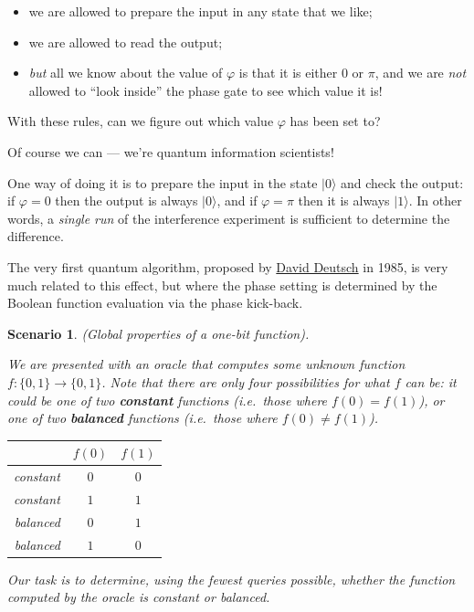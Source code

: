 \documentclass[fleqn,a4paper]{article}
\providecommand{\tightlist}{\setlength{\itemsep}{0pt}\setlength{\parskip}{0pt}}
\newtheorem*{scenario}{Scenario}
\theoremstyle{definition}
\theoremstyle{definition}
\theoremstyle{definition}
\theoremstyle{definition}
\theoremstyle{remark}
\begin{document}
\begin{itemize}
\tightlist
\item
  we are allowed to prepare the input in any state that we like;
\item
  we are allowed to read the output;
\item
  \emph{but} all we know about the value of \(\varphi\) is that it is either \(0\) or \(\pi\), and we are \emph{not} allowed to ``look inside'' the phase gate to see which value it is!
\end{itemize}

With these rules, can we figure out which value \(\varphi\) has been set to?

Of course we can --- we're quantum information scientists!

One way of doing it is to prepare the input in the state \(|0\rangle\) and check the output: if \(\varphi=0\) then the output is always \(|0\rangle\), and if \(\varphi=\pi\) then it is always \(|1\rangle\).
In other words, a \emph{single run} of the interference experiment is sufficient to determine the difference.

The very first quantum algorithm, proposed by \href{https://en.wikipedia.org/wiki/David_Deutsch}{David Deutsch} in 1985, is very much related to this effect, but where the phase setting is determined by the Boolean function evaluation via the phase kick-back.

\begin{scenario}

\emph{(Global properties of a one-bit function).}

We are presented with an oracle that computes some unknown function \(f\colon\{0,1\}\to\{0,1\}\).
Note that there are only four possibilities for what \(f\) can be: it could be one of two \textbf{constant} functions (i.e.~those where \(f(0)=f(1)\)), or one of two \textbf{balanced} functions (i.e.~those where \(f(0)\neq f(1)\)).

\begin{longtable}[]{@{}rcc@{}}
\toprule()
& \(f(0)\) & \(f(1)\) \\
\midrule()
\endhead
constant & \(0\) & \(0\) \\
constant & \(1\) & \(1\) \\
balanced & \(0\) & \(1\) \\
balanced & \(1\) & \(0\) \\
\bottomrule()
\end{longtable}

Our task is to determine, using the fewest queries possible, whether the function computed by the oracle is constant or balanced.

\end{scenario}
\end{document}
